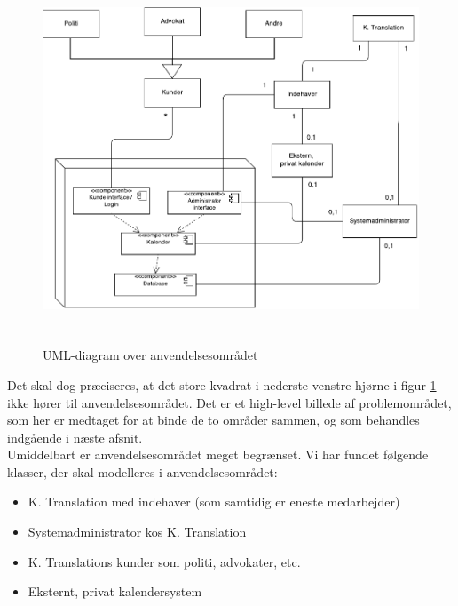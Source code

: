 \documentclass[12pt]{article}   %
\begin{document}
\begin{figure}[!ht]
\includegraphics[width=12cm, height=11cm]{anvendelsesomr.pdf}
\caption{UML-diagram over anvendelsesområdet}
\label{fig:anvend}
\end{figure}

Det skal dog præciseres, at det store kvadrat i nederste venstre hjørne i figur
\ref{fig:anvend} ikke hører til anvendelsesområdet. Det er et high-level
billede af problemområdet, som her er medtaget for at binde de to områder sammen,
og som behandles indgående i næste afsnit.\\ 
Umiddelbart er anvendelsesområdet meget begrænset. Vi har fundet følgende
klasser, der skal modelleres i anvendelsesområdet:

\begin{itemize}
\item K. Translation med indehaver (som samtidig er eneste medarbejder)
\item Systemadministrator kos K. Translation
\item K. Translations kunder som politi, advokater, etc.
\item Eksternt, privat kalendersystem 
\end{itemize}
\end{document}
